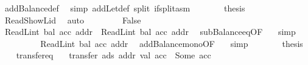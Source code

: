 \begin{isabellebody}
\ addBalance{\isacharunderscore}{\kern0pt}def\ \isamarkupfalse%
\ {\isacharparenleft}{\kern0pt}simp\ add{\isacharcolon}{\kern0pt}Let{\isacharunderscore}{\kern0pt}def\ split{\isacharcolon}{\kern0pt}\ if{\isacharunderscore}{\kern0pt}split{\isacharunderscore}{\kern0pt}asm{\isacharparenright}{\kern0pt}\isanewline
\ \ \ \ \isamarkupfalse%
\ \isamarkupfalse%
\ {\isacharquery}{\kern0pt}thesis\ \isamarkupfalse%
\ Read{\isacharunderscore}{\kern0pt}ShowL{\isacharunderscore}{\kern0pt}id\ \isamarkupfalse%
\ auto\isanewline
\ \ \isamarkupfalse%
\isanewline
\ \ \ \ \isamarkupfalse%
\ False\isanewline
\ \ \ \ \isamarkupfalse%
\ \isamarkupfalse%
\ {\isachardoublequoteopen}ReadL\isactrlsub i\isactrlsub n\isactrlsub t\ {\isacharparenleft}{\kern0pt}bal\ {\isacharparenleft}{\kern0pt}acc\ addr{\isacharparenright}{\kern0pt}{\isacharparenright}{\kern0pt}\ {\isasymle}\ ReadL\isactrlsub i\isactrlsub n\isactrlsub t\ {\isacharparenleft}{\kern0pt}bal\ {\isacharparenleft}{\kern0pt}acc{\isacharprime}{\kern0pt}{\isacharprime}{\kern0pt}\ addr{\isacharparenright}{\kern0pt}{\isacharparenright}{\kern0pt}{\isachardoublequoteclose}\ \isamarkupfalse%
\ subBalance{\isacharunderscore}{\kern0pt}eq{\isacharbrackleft}{\kern0pt}OF\ {\isacharasterisk}{\kern0pt}{\isacharbrackright}{\kern0pt}\ \isamarkupfalse%
\ simp\isanewline
\ \ \ \ \isamarkupfalse%
\ \isamarkupfalse%
\ {\isachardoublequoteopen}{\isasymdots}\ {\isasymle}\ ReadL\isactrlsub i\isactrlsub n\isactrlsub t\ {\isacharparenleft}{\kern0pt}bal\ {\isacharparenleft}{\kern0pt}acc{\isacharprime}{\kern0pt}\ addr{\isacharparenright}{\kern0pt}{\isacharparenright}{\kern0pt}{\isachardoublequoteclose}\ \isamarkupfalse%
\ addBalance{\isacharunderscore}{\kern0pt}mono{\isacharbrackleft}{\kern0pt}OF\ {\isacharasterisk}{\kern0pt}{\isacharasterisk}{\kern0pt}{\isacharbrackright}{\kern0pt}\ \isamarkupfalse%
\ simp\isanewline
\ \ \ \ \isamarkupfalse%
\ \isamarkupfalse%
\ {\isacharquery}{\kern0pt}thesis\ \isacommand{{\isachardot}{\kern0pt}}\isamarkupfalse%
\isanewline
\ \ \isamarkupfalse%
\isanewline
{}\isamarkupfalse%
%
\endisatagproof
{\isafoldproof}%
%
\isadelimproof
\isanewline
%
\endisadelimproof
\isanewline
{}\isamarkupfalse%
\ transfer{\isacharunderscore}{\kern0pt}eq{\isacharcolon}{\kern0pt}\isanewline
\ \ \ {\isachardoublequoteopen}transfer\ ads\ addr\ val\ acc\ {\isacharequal}{\kern0pt}\ Some\ acc{\isacharprime}{\kern0pt}{\isachardoublequoteclose}\isanewline

\end{isabellebody}
